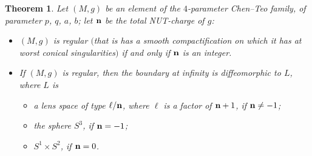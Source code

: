 \documentclass[10pt,a4paper]{amsart}
\numberwithin{equation}{section}
\newtheorem{thm}{Theorem}[section]
\begin{document}
\begin{thm} \label{thm-regular}
Let $(M, g)$ be an element of the $4$-parameter Chen--Teo family, of parameter $p$, $q$, $a$, $b$; let ${\bf n}$ be the total NUT-charge of $g$:
\begin{itemize}\itemsep=0pt
 \item[$(1)$] $(M, g)$ is regular $($that is has a smooth compactification on which it has at worst conical singularities$)$ if and only if ${\bf n}$ is an integer.
\item[$(2)$] If $(M, g)$ is regular, then the boundary at infinity is diffeomorphic to $L$, where $L$ is
 \begin{itemize}\itemsep=0pt
 \item[$(i)$] a lens space of type $\ell/{\bf n}$, where $\ell$ is a factor of ${\bf n} + 1$, if ${\bf n} \neq - 1$;
 \item[$(ii)$] the sphere $S ^3$, if ${\bf n} = - 1$; \item[$(iii)$] $S^1 \times S^2$, if ${\bf n} = 0$.
\end{itemize}
\end{itemize}
\end{thm}
\end{document}
